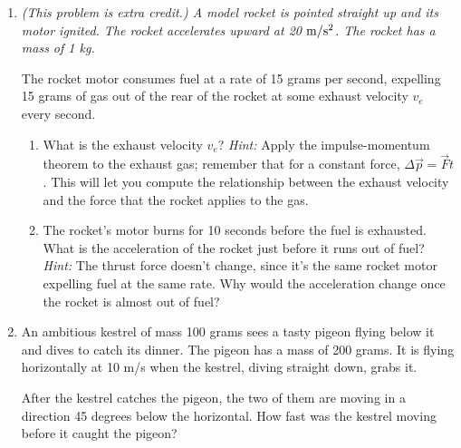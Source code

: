 \documentclass[12pt]{article}
\begin{document}
\begin{enumerate}
\item{\it (This problem is extra credit.) \rm A model rocket is pointed straight up and its motor ignited. The rocket accelerates upward at 20 $\rm m/\rm s^2$. The rocket has a mass of 1 kg.

The rocket motor consumes fuel at a rate of 15 grams per second, expelling 15 grams of gas out of the rear of the rocket at some exhaust velocity $v_e$ every second.

\begin{enumerate}
\item{What is the exhaust velocity $v_e$?}
{\it Hint:} Apply the impulse-momentum theorem to the exhaust gas; remember that for a constant force, $\Delta \vec p = \vec F t$. This will let you compute the relationship
between the exhaust velocity and the force that the rocket applies to the gas.
\item{The rocket's motor burns for 10 seconds before the fuel is exhausted. What is the acceleration of the rocket just before it runs out of fuel?}
{\it Hint:} The thrust force doesn't change, since it's the same rocket motor expelling fuel at the same rate. Why would the acceleration change once the rocket is
almost out of fuel?
\end{enumerate}


}

\item{An ambitious kestrel of mass 100 grams sees a tasty pigeon flying below it and dives to catch its dinner. The pigeon has a mass of 200 grams. It is flying horizontally at 
10 m/s when the kestrel, diving straight down, grabs it.

After the kestrel catches the pigeon, the two of them are moving in a direction 45 degrees below the horizontal. How fast was the kestrel moving before it caught the pigeon?}

\end{enumerate}
\end{document}
